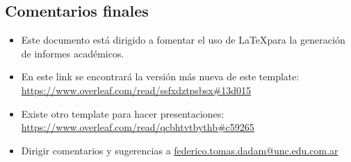 \subsection{Comentarios finales}

\begin{itemize}
    \item Este documento está dirigido a fomentar el uso de \LaTeX para la generación de informes académicos.
    \item En este link se encontrará la versión más nueva de este template: \url{https://www.overleaf.com/read/ssfxdztpsbsx#13d015}
    \item Existe otro template para hacer presentaciones: \url{https://www.overleaf.com/read/qcbhtvtbythb#c59265}
    \item Dirigir comentarios y sugerencias a \href{mailto:federico.tomas.dadam+template@unc.edu.com.ar}{federico.tomas.dadam@unc.edu.com.ar}
\end{itemize}
